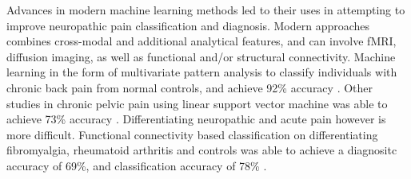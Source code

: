  Advances in modern machine learning methods led to their uses in attempting to improve neuropathic pain classification and diagnosis. Modern approaches combines cross-modal and additional analytical features, and can involve fMRI, diffusion imaging, as well as functional and/or structural connectivity. Machine learning in the form of multivariate pattern analysis to classify individuals with chronic back pain from normal controls, and achieve 92\% accuracy \cite{Callan2014}. Other studies in chronic pelvic pain using linear support vector machine was able to achieve 73\% accuracy \cite{Bagarinao2014}. Differentiating neuropathic and acute pain however is more difficult. Functional connectivity based classification on differentiating fibromyalgia, rheumatoid arthritis and controls was able to achieve a diagnositc accuracy of 69\%, and classification accuracy of 78\% \cite{Sundermann2014}.    
 
 